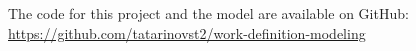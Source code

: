 \documentclass[11pt]{article}
\begin{document}
The code for this project and the model are available on GitHub: \url{https://github.com/tatarinovst2/work-definition-modeling}


%




%
\end{document}
